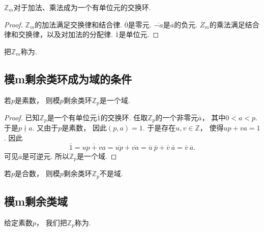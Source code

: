 \begin{proposition}\label{theorem:剩余类环.整数集对模m同余关系的商集对加法和乘法成环}
\(\mathbb{Z}_m\)对于加法、乘法成为一个有单位元的交换环.
\begin{proof}
\(\mathbb{Z}_m\)的加法满足交换律和结合律.
\(\overline{0}\)是零元.
\(\overline{-a}\)是\(\overline{a}\)的负元.
\(\overline{Z}_m\)的乘法满足结合律和交换律，以及对加法的分配律.
\(\overline{1}\)是单位元.
\end{proof}
\end{proposition}

\begin{definition}
把\(\mathbb{Z}_m\)称为.
\end{definition}

\subsection{模m剩余类环成为域的条件}
\begin{theorem}
若\(p\)是素数，
则模\(p\)剩余类环\(\mathbb{Z}_p\)是一个域.
\begin{proof}
已知\(\mathbb{Z}_p\)是一个有单位元\(\overline1\)的交换环.
任取\(\mathbb{Z}_p\)的一个非零元\(\overline{a}\)，
其中\(0<a<p\).
于是\(p \nmid a\).
又由于\(p\)是素数，
因此\((p,a)=1\).
于是存在\(u,v\in\mathbb{Z}\)，
使得\(up+va=1\).
因此\begin{equation*}
	\overline1
	=\overline{up+va}
	=\overline{up}
	+\overline{va}
	=\overline{u}~\overline{p}
	+\overline{v}~\overline{a}
	=\overline{v}~\overline{a}.
\end{equation*}
可见\(\overline{a}\)是可逆元.
所以\(\mathbb{Z}_p\)是一个域.
\end{proof}
\end{theorem}

\begin{theorem}
若\(p\)是合数，
则模\(p\)剩余类环\(\mathbb{Z}_p\)不是域.
\end{theorem}

\subsection{模m剩余类域}
\begin{definition}
给定素数\(p\)，
我们把\(\mathbb{Z}_p\)称为.
\end{definition}

